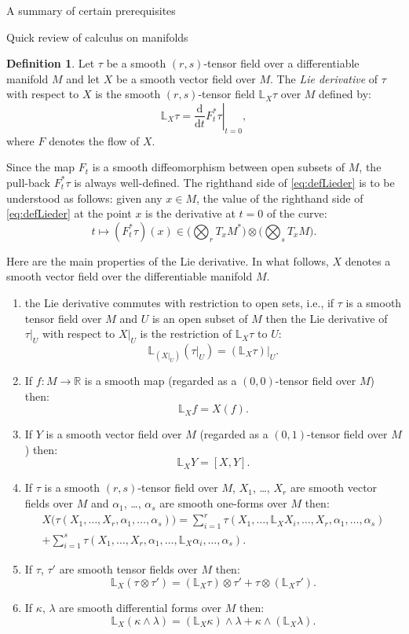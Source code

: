 \documentclass[oneside,a4paper,11pt]{amsbook}
\newcommand{\R}{\mathds R}
\newcommand{\dd}{\mathrm d}
\theoremstyle{remark}\newtheorem{exercise}{Exercise}[chapter]
\theoremstyle{plain}\newtheorem{teo}{Theorem}[section]
\theoremstyle{plain}\newtheorem{lem}[teo]{Lemma}
\theoremstyle{plain}\newtheorem{prop}[teo]{Proposition}
\theoremstyle{plain}\newtheorem{cor}[teo]{Corollary}
\theoremstyle{definition}\newtheorem{defin}[teo]{Definition}
\theoremstyle{remark}\newtheorem{rem}[teo]{Remark}
\theoremstyle{definition}\newtheorem{notation}[teo]{Notation}
\theoremstyle{definition}\newtheorem{convention}[teo]{Convention}
\theoremstyle{definition}\newtheorem{example}[teo]{Example}
\numberwithin{section}{chapter}
\numberwithin{equation}{section}
\begin{document}
\begin{chapter}{A summary of certain prerequisites}
\begin{section}{Quick review of calculus on manifolds}
\begin{defin}
Let $\tau$ be a smooth $(r,s)$-tensor field over a differentiable manifold $M$ and let $X$ be a smooth vector field over
$M$. The {\em Lie derivative\/} of $\tau$ with respect to $X$ is the smooth $(r,s)$-tensor field $\mathbb L_X\tau$ over
$M$ defined by:
\begin{equation}\label{eq:defLieder}
\mathbb L_X\tau=\left.\frac{\dd}{\dd t}F_t^*\tau\right\vert_{t=0},
\end{equation}
where $F$ denotes the flow of $X$.
\end{defin}
Since the map $F_t$ is a smooth diffeomorphism between open subsets of $M$, the pull-back $F_t^*\tau$
is always well-defined. The righthand side of \eqref{eq:defLieder}
is to be understood as follows: given any $x\in M$, the value of the righthand side of \eqref{eq:defLieder} at
the point $x$ is the derivative at $t=0$ of the curve:
\[t\longmapsto(F_t^*\tau)(x)\in\Big(\bigotimes_rT_xM^*\Big)\otimes\Big(\bigotimes_sT_xM\Big).\]

Here are the main properties of the Lie derivative. In what follows, $X$ denotes a smooth vector field over the differentiable manifold $M$.
\begin{enumerate}
\item the Lie derivative commutes with restriction to open sets, i.e., if $\tau$ is a smooth tensor field over $M$
and $U$ is an open subset of $M$ then the Lie derivative of $\tau\vert_U$ with respect to $X\vert_U$ is the restriction
of $\mathbb L_X\tau$ to $U$:
\[\mathbb L_{(X\vert_U)}(\tau\vert_U)=(\mathbb L_X\tau)\vert_U.\]
\item If $f:M\to\R$ is a smooth map (regarded as a $(0,0)$-tensor field over $M$) then:
\[\mathbb L_Xf=X(f).\]
\item If $Y$ is a smooth vector field over $M$ (regarded as a $(0,1)$-tensor field over $M$) then:
\[\mathbb L_XY=[X,Y].\]
\item If $\tau$ is a smooth $(r,s)$-tensor field over $M$, $X_1$, \dots, $X_r$ are smooth vector fields over $M$
and $\alpha_1$, \dots, $\alpha_s$ are smooth one-forms over $M$ then:
\begin{multline*}
X\big(\tau(X_1,\ldots,X_r,\alpha_1,\ldots,\alpha_s)\big)=\sum_{i=1}^r\tau(X_1,\ldots,\mathbb L_XX_i,\ldots,X_r,
\alpha_1,\ldots,\alpha_s)\\
+\sum_{i=1}^s\tau(X_1,\ldots,X_r,\alpha_1,\ldots,\mathbb L_X\alpha_i,\ldots,\alpha_s).
\end{multline*}
\item If $\tau$, $\tau'$ are smooth tensor fields over $M$ then:
\[\mathbb L_X(\tau\otimes\tau')=(\mathbb L_X\tau)\otimes\tau'+\tau\otimes(\mathbb L_X\tau').\]
\item If $\kappa$, $\lambda$ are smooth differential forms over $M$ then:
\[\mathbb L_X(\kappa\wedge\lambda)=(\mathbb L_X\kappa)\wedge\lambda+\kappa\wedge(\mathbb L_X\lambda).\]
\end{enumerate}


\end{section}
\end{chapter}
\end{document}
